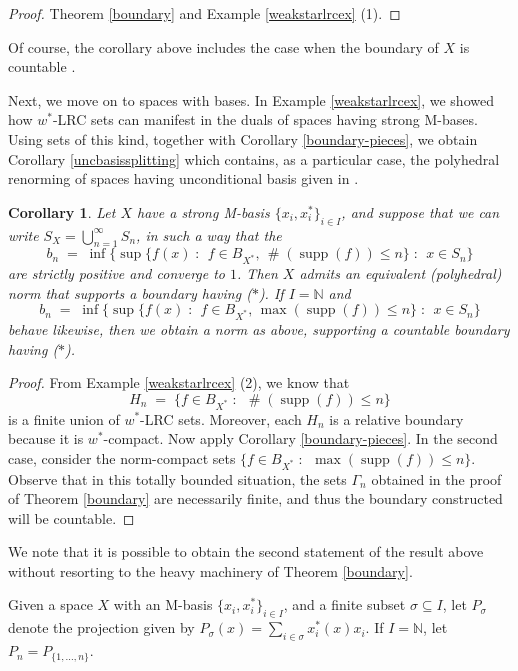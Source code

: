 \documentclass[12pt,a4paper]{amsart}
\newtheorem{corollary}[theorem]{Corollary}
\theoremstyle{definition}
\theoremstyle{remark}
\DeclareMathOperator{\card}{\#}
\DeclareMathOperator{\supp}{supp}
\newcommand{\N}{\mathbb{N}}
\newcommand{\set}[2]{\{{#1} \;:\;\, {#2}\}}
\newcommand{\st}{($*$)}
\begin{document}
\begin{proof}
Theorem \ref{boundary} and Example \ref{weakstarlrcex} (1).
\end{proof}

Of course, the corollary above includes the case when the boundary of
$X$ is countable \cite{fonf2}.

Next, we move on to spaces with bases. In Example \ref{weakstarlrcex}, we
showed how $w^*$-LRC sets can manifest in the duals of spaces having strong M-bases.
Using sets of this kind, together with Corollary \ref{boundary-pieces}, we obtain
Corollary \ref{uncbasissplitting} which contains, as a particular case, the
polyhedral renorming of spaces having unconditional basis given in \cite[Theorem 24]{FPST}.

\begin{corollary}\label{m-basissplitting}
Let $X$ have a strong M-basis $\{x_i,x_i^*\}_{i \in I}$, and suppose
that we can write $S_X = \bigcup_{n=1}^\infty S_n$, in such a way
that the
\[
b_n \;=\; \inf\set{\sup\set{f(x)}{f \in B_{X^*},\, \card(\supp (f))
\leq n}}{x \in S_n}
\]
are strictly positive and converge to $1$. Then $X$ admits an
equivalent (polyhedral) norm that supports a boundary having {\st}.
If $I=\N$ and
\[
b_n \;=\; \inf\set{\sup\set{f(x)}{f \in B_{X^*},\, \max(\supp(f))
\leq n}}{x \in S_n}
\]
behave likewise, then we obtain a norm as above, supporting a countable
boundary having {\st}.
\end{corollary}

\begin{proof}
From Example \ref{weakstarlrcex} (2), we know that
\[
H_n \;=\; \set{f \in B_{X^*}}{\card(\supp(f)) \leq n}
\]
is a finite union of $w^*$-LRC sets. Moreover, each $H_n$ is a
relative boundary because it is $w^*$-compact. Now
apply Corollary \ref{boundary-pieces}. In the second case, consider
the norm-compact sets $\set{f \in B_{X^*}}{\max(\supp(f)) \leq n}$.
Observe that in this totally bounded situation, the sets $\Gamma_n$ obtained
in the proof of Theorem \ref{boundary} are necessarily finite,
and thus the boundary constructed will be countable.
\end{proof}

We note that it is possible to obtain the second statement of the result
above without resorting to the heavy machinery of Theorem \ref{boundary}.

Given a space $X$ with an M-basis $\{x_i,x_i^*\}_{i \in I}$, and a finite
subset $\sigma \subseteq I$, let $P_\sigma$ denote the projection given by
$P_\sigma(x) = \sum_{i \in \sigma} x_i^*(x)x_i$. If $I=\N$, let $P_n = P_{\{1,\dots, n\}}$.
\end{document}
